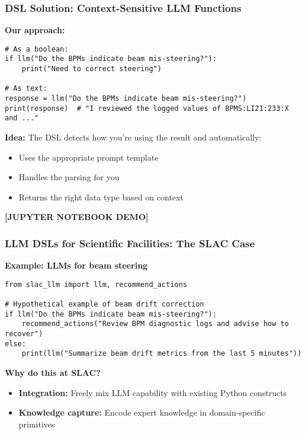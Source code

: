 \documentclass{beamer}
\begin{document}
\begin{frame}[fragile]
\frametitle{DSL Solution: Context-Sensitive LLM Functions}

\textbf{Our approach:}
\begin{lstlisting}[basicstyle=\ttfamily\footnotesize]
# As a boolean:
if llm("Do the BPMs indicate beam mis-steering?"):
    print("Need to correct steering")

# As text:
response = llm("Do the BPMs indicate beam mis-steering?")
print(response)  # "I reviewed the logged values of BPMS:LI21:233:X and ..."
\end{lstlisting}

\textbf{Idea:} The DSL detects how you're using the result and automatically:
\begin{itemize}
\item Uses the appropriate prompt template
\item Handles the parsing for you
\item Returns the right data type based on context
\end{itemize}
\end{frame}

\begin{frame}
\begin{center}
\vspace{1cm}
\textbf{[JUPYTER NOTEBOOK DEMO]}
\end{center}
\end{frame}

\begin{frame}[fragile]
\frametitle{LLM DSLs for Scientific Facilities: The SLAC Case}

\textbf{Example: LLMs for beam steering}
\begin{lstlisting}[basicstyle=\ttfamily\footnotesize]
from slac_llm import llm, recommend_actions

# Hypothetical example of beam drift correction
if llm("Do the BPMs indicate beam mis-steering?"):
    recommend_actions("Review BPM diagnostic logs and advise how to recover")
else:
    print(llm("Summarize beam drift metrics from the last 5 minutes"))
\end{lstlisting}

\vspace{0.3cm}
\textbf{Why do this at SLAC?}
\begin{itemize}
\item \textbf{Integration:} Freely mix LLM capability with existing Python constructs
\item \textbf{Knowledge capture:} Encode expert knowledge in domain-specific primitives
\end{itemize}

\centering
\end{frame}
\end{document}
